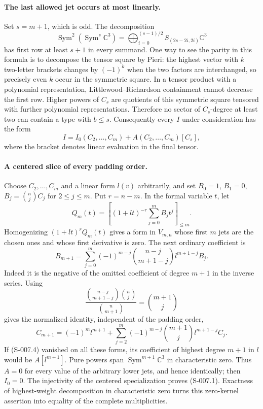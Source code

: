 \paragraph{The last allowed jet occurs at most linearly.}
Set $s=m+1$, which is odd.  The decomposition
\[
 \operatorname{Sym}^2(\operatorname{Sym}^s\mathbb C^3)
   =\bigoplus_{i=0}^{(s-1)/2}S_{(2s-2i,2i)}\mathbb C^3          \tag{S-007.3}
\]
has first row at least $s+1$ in every summand.  One way to see the
parity in this formula is to decompose the tensor square by Pieri:
the highest vector with $k$ two-letter brackets changes by $(-1)^k$
when the two factors are interchanged, so precisely even $k$ occur
in the symmetric square.  In a tensor product with a polynomial
representation, Littlewood--Richardson containment cannot decrease
the first row.  Higher powers of $C_s$ are quotients of this symmetric
square tensored with further polynomial representations.  Therefore
no sector of $C_s$-degree at least two can contain a type with
$b\leq s$.  Consequently every $I$ under consideration has the form
\[
             I=I_0(C_2,\ldots,C_m)+A(C_2,\ldots,C_m)[C_s],     \tag{S-007.4}
\]
where the bracket denotes linear evaluation in the final tensor.

\paragraph{A centered slice of every padding order.}
Choose $C_2,\ldots,C_m$ and a linear form $l(v)$ arbitrarily, and set
$B_0=1$, $B_1=0$, $B_j=\binom nj C_j$ for $2\leq j\leq m$.
Put $r=n-m$.  In the formal variable $t$, let
\[
 Q_m(t)=\left[(1+lt)^{-r}\sum_{j=0}^m B_jt^j\right]_{\leq m}.
\]
Homogenizing $(1+lt)^rQ_m(t)$ gives a form in $V_{m,n}$ whose
first $m$ jets are the chosen ones and whose first derivative is
zero.  The next ordinary coefficient is
\[
 B_{m+1}=\sum_{j=0}^m(-1)^{m-j}
              \binom{n-j}{m+1-j}l^{m+1-j}B_j.
\]
Indeed it is the negative of the omitted coefficient of degree
$m+1$ in the inverse series.  Using
\[
 \frac{\binom{n-j}{m+1-j}\binom nj}{\binom n{m+1}}
                  =\binom{m+1}j
\]
gives the normalized identity, independent of the padding order,
\[
 C_{m+1}=(-1)^m l^{m+1}
       +\sum_{j=2}^m(-1)^{m-j}\binom{m+1}j l^{m+1-j}C_j.       \tag{S-007.5}
\]
If (S-007.4) vanished on all these forms, its coefficient of highest
degree $m+1$ in $l$ would be $A[l^{m+1}]$.  Pure powers span
$\operatorname{Sym}^{m+1}\mathbb C^3$ in characteristic zero.
Thus $A=0$ for every value of the arbitrary lower jets, and hence
identically; then $I_0=0$.  The injectivity of the centered
specialization proves (S-007.1).  Exactness of highest-weight
decomposition in characteristic zero turns this zero-kernel assertion
into equality of the complete multiplicities.


